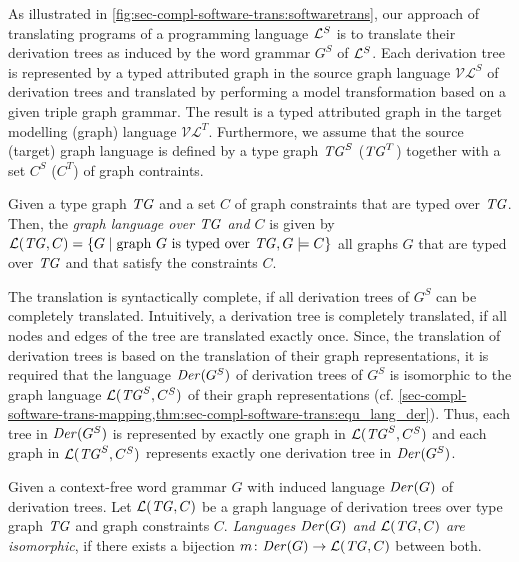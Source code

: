 As illustrated in \cref{fig:sec-compl-software-trans:softwaretrans}, our approach of translating programs of a programming language $\mathcal{L}^S$ is to translate their derivation trees as induced by the word grammar $G^S$ of $\mathcal{L}^S$.
Each derivation tree is represented by a typed attributed graph in the source graph language $\mathcal{VL}^S$ of derivation trees and translated by performing a model transformation based on a given triple graph grammar.
The result is a typed attributed graph in the target modelling (graph) language $\mathcal{VL}^T$.
Furthermore, we assume that the source (target) graph language is defined by a type graph $\mathit{TG}^S$ ($\mathit{TG}^T$) together with a set $C^S$ ($C^T$) of graph contraints.

\begin{definition}
Given a type graph $\mathit{TG}$ and a set $C$ of graph constraints that are typed over $\mathit{TG}$.
Then, the \emph{graph language over $\mathit{TG}$ and $C$} is given by $\mathcal{L}(\mathit{TG},C)=\{G \mid \text{graph }G\text{ is typed over }\mathit{TG},G \models C\}$ all graphs $G$ that are typed over $\mathit{TG}$ and that satisfy the constraints $C$.
\envEndMarker
\end{definition}

The translation is syntactically complete, if all derivation trees of $G^S$ can be completely translated.
Intuitively, a derivation tree is completely translated, if all nodes and edges of the tree are translated exactly once.
Since, the translation of derivation trees is based on the translation of their graph representations, it is required that the language $\mathit{Der}(G^S)$ of derivation trees of  $G^S$ is isomorphic to the graph language $\mathcal{L}(\mathit{TG}^S,C^S)$ of their graph representations (cf. \cref{sec-compl-software-trans-mapping,thm:sec-compl-software-trans:equ_lang_der}).
Thus, each tree in $\mathit{Der}(G^S)$ is represented by exactly one graph in $\mathcal{L}(\mathit{TG}^S,C^S)$ and each graph in $\mathcal{L}(\mathit{TG}^S,C^S)$ represents exactly one derivation tree in $\mathit{Der}(G^S)$.

\begin{definition}
\label{def:sec-compl-software-trans-prob:iso}
Given a context-free word grammar $G$ with induced language $\mathit{Der}(G)$ of derivation trees.
Let $\mathcal{L}(\mathit{TG},C)$ be a graph language of derivation trees over type graph $\mathit{TG}$ and graph constraints $C$.
\emph{Languages $\mathit{Der}(G)$ and $\mathcal{L}(\mathit{TG},C)$ are isomorphic}, if there exists a bijection $m\colon \mathit{Der}(G) \to \mathcal{L}(\mathit{TG},C)$ between both.
\envEndMarker
\end{definition}

